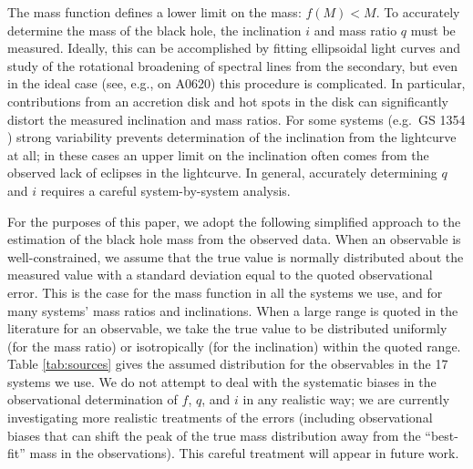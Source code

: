 \documentclass[preprint]{aastex}
\begin{document}
The mass function defines a lower limit on the mass: $f(M) < M$.  To
accurately determine the mass of the black hole, the inclination $i$
and mass ratio $q$ must be measured.  Ideally, this can be
accomplished by fitting ellipsoidal light curves and study of the
rotational broadening of spectral lines from the secondary, but even
in the ideal case (see, e.g., \citet{Cantrell2010} on A0620) this
procedure is complicated.  In particular, contributions from an
accretion disk and hot spots in the disk can significantly distort the
measured inclination and mass ratios.  For some systems (e.g.\ GS 1354
\citep{Casares2009}) strong variability prevents determination of the
inclination from the lightcurve at all; in these cases an upper limit
on the inclination often comes from the observed lack of eclipses in
the lightcurve.  In general, accurately determining $q$ and $i$
requires a careful system-by-system analysis.

For the purposes of this paper, we adopt the following simplified
approach to the estimation of the black hole mass from the observed
data.  When an observable is well-constrained, we assume that the true
value is normally distributed about the measured value with a standard
deviation equal to the quoted observational error.  This is the case
for the mass function in all the systems we use, and for many systems'
mass ratios and inclinations.  When a large range is quoted in the
literature for an observable, we take the true value to be distributed
uniformly (for the mass ratio) or isotropically (for the inclination)
within the quoted range.  Table \ref{tab:sources} gives the assumed
distribution for the observables in the 17 systems we use.  We do not
attempt to deal with the systematic biases in the observational
determination of $f$, $q$, and $i$ in any realistic way; we are
currently investigating more realistic treatments of the errors
(including observational biases that can shift the peak of the true
mass distribution away from the ``best-fit'' mass in the
observations).  This careful treatment will appear in future work.
\end{document}
